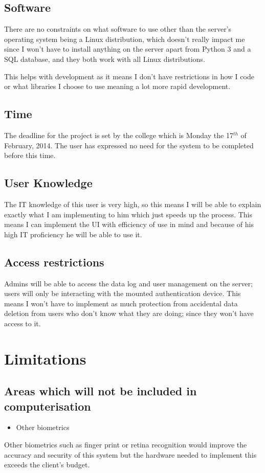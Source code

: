 \documentclass[12pt,a4paper]{report}
\begin{document}
\subsection{Software}\label{section:_Toc370402526}
There are no constraints on what software to use other than the server's 
operating system being a Linux distribution, which doesn't really impact 
me since I won't have to install anything on the server apart from 
Python 3 and a SQL database, and they both work with all Linux 
distributions. 

This helps with development as it means I don't have restrictions in how 
I code or what libraries I choose to use meaning a lot more rapid 
development.

\subsection{Time}\label{section:_Toc370402527}
The deadline for the project is set by the college which is Monday the 
17$^{th}$ of February, 2014. The user has expressed no need for the 
system to be completed before this time.

\subsection{User Knowledge}\label{section:_Toc370402528}
The IT knowledge of this user is very high, so this means I will be able 
to explain exactly what I am implementing to him which just speeds up 
the process. This means I can implement the UI with efficiency of use in 
mind and because of his high IT proficiency he will be able to use it.

\subsection{Access restrictions}\label{section:_Toc370402529}
Admins will be able to access the data log and user management on the 
server; users will only be interacting with the mounted authentication 
device. This means I won't have to implement as much protection from 
accidental data deletion from users who don't know what they are doing; 
since they won't have access to it.

\section{Limitations}\label{section:_Toc370402530}
\subsection{Areas which will not be included in 
computerisation}\label{section:_Toc370402531}
\begin{itemize}
\item Other biometrics
\end{itemize}
Other biometrics such as finger print or retina recognition would 
improve the accuracy and security of this system but the hardware needed 
to implement this exceeds the client's budget.
\end{document}
